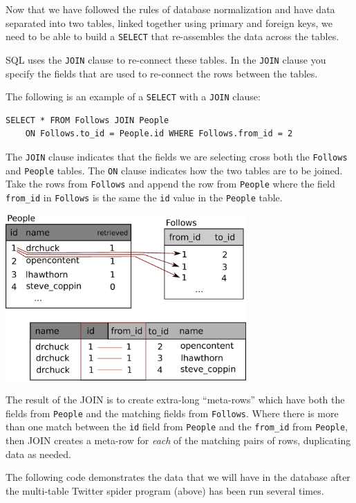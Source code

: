 \documentclass[10pt]{book}
\begin{document}
Now that we have followed the rules of database normalization
and have data separated into two tables, linked together using
primary and foreign keys, we need to be able to build a 
{\tt SELECT} that re-assembles the data across the tables.

SQL uses the {\tt JOIN} clause to re-connect these tables.  
In the {\tt JOIN} clause you specify the fields that are used 
to re-connect the rows between the tables.

The following is an example of a {\tt SELECT} with a 
{\tt JOIN} clause:

\beforeverb
\begin{verbatim}
SELECT * FROM Follows JOIN People 
    ON Follows.to_id = People.id WHERE Follows.from_id = 2
\end{verbatim}
\afterverb
%
The {\tt JOIN} clause indicates that the fields we are selecting
cross both the {\tt Follows} and {\tt People} tables.  The {\tt ON}
clause indicates how the two tables are to be joined.   Take the rows
from {\tt Follows} and append the row from {\tt People} where the
field \verb"from_id" in {\tt Follows} is the same the {\tt id} value
in the {\tt People} table.

\beforefig
\centerline{\includegraphics[height=2.50in]{figs2/join.eps}}
\afterfig

The result of the JOIN is to create extra-long ``meta-rows'' which have both 
the fields from {\tt People} and the matching fields from {\tt Follows}.
Where there is more than one match between the {\tt id} field from {\tt People}
and the \verb"from_id" from {\tt People}, then JOIN creates a meta-row 
for \emph{each} of the matching pairs of rows, duplicating data as needed.

The following code demonstrates the data that we will have in the 
database after the multi-table Twitter spider program (above) has
been run several times.
\end{document}
